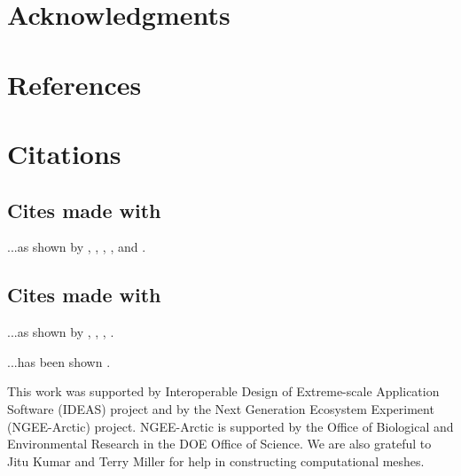\section*{Acknowledgments} 

 
\section*{References}



\section*{Citations}


\subsection*{Cites made with \tt\string\citett\string{\string}}
...as shown by , , ,
, and . 

\subsection*{Cites made with \tt\string\citetp\string{\string}}
...as shown by , , ,
. 

...has been shown .







%

\acknowledgments
This work was supported by Interoperable Design of Extreme-scale Application Software (IDEAS) project and by the Next Generation Ecosystem Experiment
(NGEE-Arctic) project. NGEE-Arctic is supported by the Office of Biological and Environmental Research in the DOE Office of Science. We are also grateful to Jitu Kumar and Terry Miller for help in constructing computational meshes.



%
%
%
%
%
%
%
%
%


